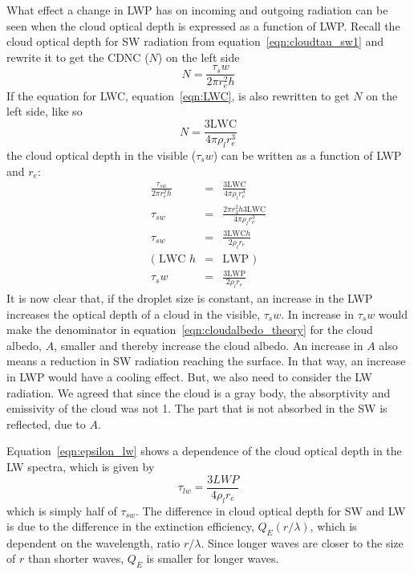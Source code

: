 What effect a change in LWP has on incoming and outgoing radiation can be seen when the cloud optical depth is expressed as a function of LWP. Recall the cloud optical depth for SW radiation %
from equation~\ref{eqn:cloudtau_sw1} and rewrite it to get the CDNC ($N$) on the left side
\begin{equation}
N = \frac{\tau_sw}{2\pi r^2_e h}
\end{equation}
If the equation for LWC, equation~\ref{eqn:LWC}, is also rewritten to get $N$ on the left side, like so
\begin{equation}
N = \frac{3\text{LWC}}{4\pi \rho_l r^3_e}
\end{equation}
the cloud optical depth in the visible ($\tau_sw$) can be written as a function of LWP and $r_e$:
\begin{eqnarray}
\frac{\tau_{sw}}{2\pi r^2_e h} &=& \frac{3\text{LWC}}{4\pi \rho_l r^3_e}\\
\tau_{sw} &=& \frac{2\pi r^2_3 h 3\text{LWC}}{4\pi \rho_l r^3_e}\\
\tau_{sw} &=& \frac{3\text{LWC} h}{2\rho_l r_e}\\
\text{( LWC }h &=& \text{LWP )}\\
\tau_sw &=& \frac{3\text{LWP}}{2\rho_l r_e}
\label{eqn:cloudtau_sw}
\end{eqnarray}
It is now clear that, if the droplet size is constant, an increase in the LWP increases the optical depth of a cloud in the visible, $\tau_sw$. In increase in $\tau_sw$ would make the denominator in equation~\ref{eqn:cloudalbedo_theory} for the cloud albedo, $A$, smaller and thereby increase the cloud albedo. An increase in $A$ also means a reduction in SW radiation reaching the surface. In that way, an increase in LWP would have a cooling effect. But, we also need to consider the LW radiation. We agreed that since the cloud is a gray body, the absorptivity and emissivity of the cloud was not 1. The part that is not absorbed in the SW is reflected, due to $A$. 

Equation~\ref{eqn:epsilon_lw} shows a dependence of the cloud optical depth in the LW spectra, which is given by
\begin{equation}
\tau_{lw} = \frac{3LWP}{4\rho_l r_e}
\end{equation}
which is simply half of $\tau_{sw}$. The difference in cloud optical depth for SW and LW is due to the difference in the extinction efficiency, $Q_E(r/\lambda)$, which is dependent on the wavelength, ratio $r/\lambda$. Since longer waves are closer to the size of $r$ than shorter waves, $Q_E$ is smaller for longer waves.



